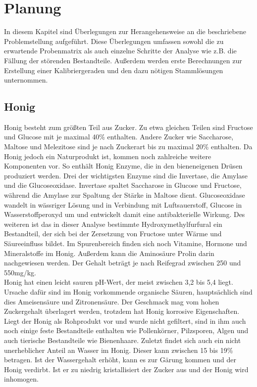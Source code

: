 \chapter{Planung}

\label{chap:Planung}
In diesem Kapitel sind Überlegungen zur Herangehensweise an die beschriebene Problemstellung aufgeführt. Diese Überlegungen umfassen sowohl die zu erwartende Probenmatrix als auch einzelne Schritte der Analyse wie z.B. die Fällung der störenden Bestandteile. Außerdem werden erste Berechnungen zur Erstellung einer Kalibriergeraden und den dazu nötigen Stammlösungen unternommen.

\section{Honig}
Honig besteht zum größten Teil aus Zucker. Zu etwa gleichen Teilen sind Fructose und Glucose mit je maximal 40\% enthalten. Andere Zucker wie Saccharose, Maltose und Melezitose sind je nach Zuckerart bis zu maximal 20\% enthalten. Da Honig jedoch ein Naturprodukt ist, kommen noch zahlreiche weitere Komponenten vor. So enthält Honig Enzyme, die in den bieneneigenen Drüsen produziert werden. Drei der wichtigsten Enzyme sind die Invertase, die Amylase und die Glucoseoxidase. Invertase spaltet Saccharose in Glucose und Fructose, während die Amylase zur Spaltung der Stärke in Maltose dient. Glucoseoxidase wandelt in wässriger Lösung und in Verbindung mit Luftsauerstoff, Glucose in Wasserstoffperoxyd um und entwickelt damit eine antibakterielle Wirkung. Des weiteren ist das in dieser Analyse bestimmte Hydroxymethylfurfural ein Bestandteil, der sich bei der Zersetzung von Fructose unter Wärme und Säureeinfluss bildet. Im Spurenbereich finden sich noch Vitamine, Hormone und Mineralstoffe im Honig. Außerdem kann die Aminosäure Prolin darin nachgewiesen werden. Der Gehalt beträgt je nach Reifegrad zwischen 250 und 550mg/kg.\\
Honig hat einen leicht sauren pH-Wert, der meist zwischen 3,2 bis 5,4 liegt. Ursache dafür sind im Honig vorkommende organische Säuren, hauptsächlich sind dies Ameisensäure und Zitronensäure. Der Geschmack mag vom hohen Zuckergehalt überlagert werden, trotzdem hat Honig korrosive Eigenschaften.\\
Liegt der Honig als Rohprodukt vor und wurde nicht gefiltert, sind in ihm auch noch einige feste Bestandteile enthalten wie Pollenkörner, Pilzsporen, Algen und auch tierische Bestandteile wie Bienenhaare. Zuletzt findet sich auch ein nicht unerheblicher Anteil an Wasser im Honig. Dieser kann zwischen 15 bis 19\% betragen. Ist der Wassergehalt erhöht, kann es zur Gärung kommen und der Honig verdirbt. Ist er zu niedrig kristallisiert der Zucker aus und der Honig wird inhomogen.\\
